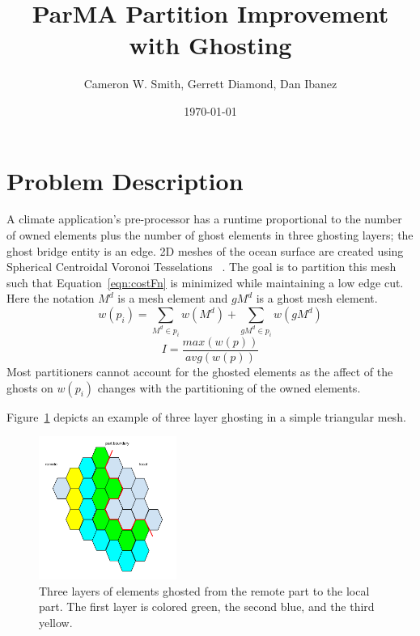 \documentclass[a4paper]{article}
\title{ParMA Partition Improvement with Ghosting}
\author{Cameron W. Smith, Gerrett Diamond, Dan Ibanez}
\date{\today}
\begin{document}
\maketitle

\section{Problem Description}

A climate application's pre-processor has a runtime proportional to the number
of owned elements plus the number of ghost elements in three ghosting layers;
the ghost bridge entity is an edge.
2D meshes of the ocean surface are created using Spherical Centroidal Voronoi
Tesselations ~\cite{JuRingler2011,ringler2008}.
The goal is to partition this mesh such that Equation~\ref{eqn:costFn} is
minimized while maintaining a low edge cut.
Here the notation $M^d$ is a mesh element and $gM^d$ is a ghost mesh element.
\begin{equation}
\label{eqn:weightVoroni}
w(p_i) = \sum_{M^d \in p_i}w(M^d) + \sum_{gM^d \in p_i}w(gM^d)
\end{equation}
\begin{equation}
\label{eqn:costFn}
I = \frac{max(w(p))}{avg(w(p))}
\end{equation}
Most partitioners cannot account for the ghosted elements as the affect of the
ghosts on $w(p_i)$ changes with the partitioning of the owned elements.


Figure~\ref{fig:ghostEx} depicts an example of three layer ghosting in a simple
triangular mesh.


\begin{figure}
\centering
\includegraphics[width=0.4\textwidth]{ghostingExample.png}
\caption{\label{fig:ghostEx}
  Three layers of elements ghosted from the remote part to the local part.
  The first layer is colored green, the second blue, and the third yellow.
}
\end{figure}
\end{document}
